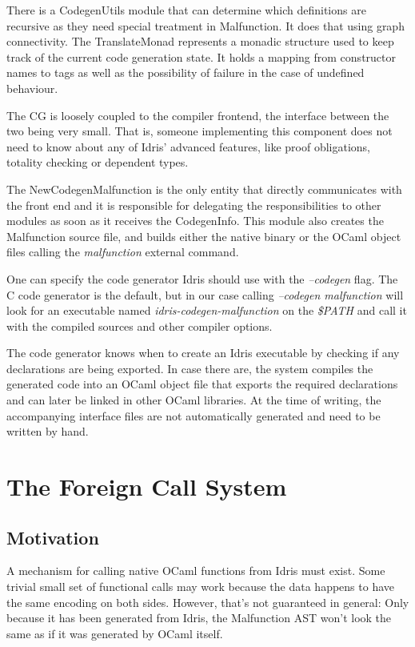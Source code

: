 There is a CodegenUtils module that can determine which
definitions are recursive as they need special treatment
in Malfunction. It does that using graph connectivity.
The TranslateMonad represents a monadic structure used
to keep track of the current code generation state.
It holds a mapping from constructor names to tags as well
as the possibility of failure in the case of undefined
behaviour.

The CG is loosely coupled to the compiler frontend,
the interface between the two being very small.
That is, someone implementing this component does not need
to know about any of Idris' advanced features, like proof
obligations, totality checking or dependent types.

The NewCodegenMalfunction is the only entity that directly
communicates with the front end and it is responsible for
delegating the responsibilities to other modules as
soon as it receives the CodegenInfo. This module also creates
the Malfunction source file, and builds either the native binary
or the OCaml object files calling the \emph{malfunction}
external command.

One can specify the code generator Idris should use with
the \emph{--codegen } flag.
The C code generator is the default, but in our case
calling \emph{--codegen malfunction} will look for an
executable named \emph{idris-codegen-malfunction} on the
\emph{\$PATH} and call it with the compiled sources and
other compiler options.

The code generator knows when to create an Idris executable
by checking if any declarations are being exported.
In case there are, the system compiles the generated code
into an OCaml object file that exports the required declarations
and can later be linked in other OCaml libraries. At the time
of writing, the accompanying interface files are not
automatically generated and need to be written by hand.



\section{The Foreign Call System}
\subsection{Motivation}
A mechanism for calling native OCaml functions from
Idris must exist.
Some trivial small set of functional calls may work
because the data happens to have the same encoding on
both sides. However, that's not guaranteed in general:
Only because it has been generated from Idris, the Malfunction
AST won't look the same as if it was generated by OCaml itself.

